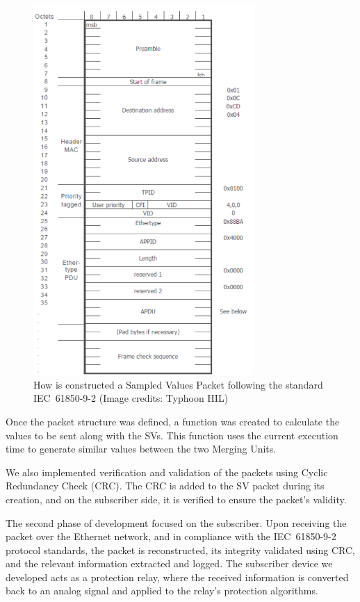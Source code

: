 \begin{figure}[tbh!]
	\centering
	\includegraphics[width=0.75\textwidth, keepaspectratio]{ch4/assets/SV_Packtes.png} %
	\caption{How is constructed a Sampled Values Packet following the standard IEC~61850-9-2 (Image credits: Typhoon HIL)}
	\label{fig:sv_packet}
\end{figure}


Once the packet structure was defined, a function was created to calculate the values to be sent along with the SVs. This function uses the current execution time to generate similar values between the two Merging Units.

We also implemented verification and validation of the packets using Cyclic Redundancy Check (CRC). The CRC is added to the SV packet during its creation, and on the subscriber side, it is verified to ensure the packet's validity.

The second phase of development focused on the subscriber. Upon receiving the packet over the Ethernet network, and in compliance with the IEC~61850-9-2 protocol standards, the packet is reconstructed, its integrity validated using CRC, and the relevant information extracted and logged. The subscriber device we developed acts as a protection relay, where the received information is converted back to an analog signal and applied to the relay’s protection algorithms.

